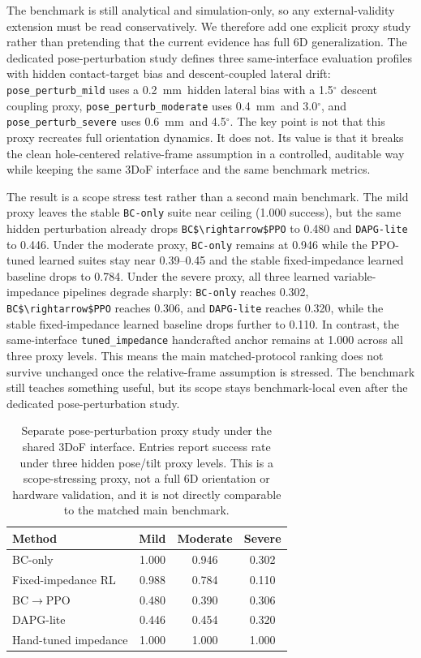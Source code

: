﻿\documentclass[11pt]{article}
\newcommand{\code}[1]{\nolinkurl{#1}}
\newcommand{\mm}{\ensuremath{\mathrm{mm}}}
\begin{document}
The benchmark is still analytical and simulation-only, so any external-validity extension must be
read conservatively. We therefore add one explicit proxy study rather than pretending that the
current evidence has full 6D generalization. The dedicated pose-perturbation study defines three
same-interface evaluation profiles with hidden contact-target bias and descent-coupled lateral
drift: \code{pose\_perturb\_mild} uses a 0.2~\mm\ hidden lateral bias with a 1.5$^\circ$ descent
coupling proxy, \code{pose\_perturb\_moderate} uses 0.4~\mm\ and 3.0$^\circ$, and
\code{pose\_perturb\_severe} uses 0.6~\mm\ and 4.5$^\circ$. The key point is not that this proxy
recreates full orientation dynamics. It does not. Its value is that it breaks the clean
hole-centered relative-frame assumption in a controlled, auditable way while keeping the same 3DoF
interface and the same benchmark metrics.

The result is a scope stress test rather than a second main benchmark. The mild proxy leaves the
stable \code{BC-only} suite near ceiling (1.000 success), but the same hidden perturbation already drops
\code{BC$\rightarrow$PPO} to 0.480 and \code{DAPG-lite} to 0.446. Under the moderate proxy,
\code{BC-only} remains at 0.946 while the PPO-tuned learned suites stay near 0.39--0.45 and the
stable fixed-impedance learned baseline drops to 0.784. Under the severe proxy, all three learned
variable-impedance pipelines degrade sharply: \code{BC-only} reaches 0.302, \code{BC$\rightarrow$PPO}
reaches 0.306, and \code{DAPG-lite} reaches 0.320, while the stable fixed-impedance learned
baseline drops further to 0.110. In contrast, the same-interface
\code{tuned\_impedance} handcrafted anchor remains at 1.000 across all three proxy levels.
This means the main matched-protocol ranking does not survive unchanged once the relative-frame
assumption is stressed. The benchmark still teaches something useful, but its scope stays
benchmark-local even after the dedicated pose-perturbation study.

\begin{table}[t]
  \centering
  \small
  \caption{Separate pose-perturbation proxy study under the shared 3DoF interface. Entries report
  success rate under three hidden pose/tilt proxy levels. This is a scope-stressing proxy, not a
  full 6D orientation or hardware validation, and it is not directly comparable to the matched
  main benchmark.}
  \label{tab:pose_perturbation}
  \begin{tabular}{lccc}
    \toprule
    Method & Mild & Moderate & Severe \\
    \midrule
    BC-only & 1.000 & 0.946 & 0.302 \\
    Fixed-impedance RL & 0.988 & 0.784 & 0.110 \\
    BC$\rightarrow$PPO & 0.480 & 0.390 & 0.306 \\
    DAPG-lite & 0.446 & 0.454 & 0.320 \\
    Hand-tuned impedance & 1.000 & 1.000 & 1.000 \\
    \bottomrule
  \end{tabular}
\end{table}
\end{document}
